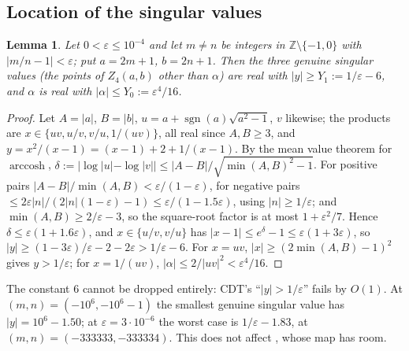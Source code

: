 \documentclass[11pt]{amsart}
\newtheorem{lemma}[proposition]{Lemma}
\theoremstyle{definition}
\theoremstyle{remark}
\numberwithin{equation}{section}
\newcommand{\ZZ}{\mathbb{Z}}
\begin{document}
\subsection{Location of the singular values}

\begin{lemma}\label{lem:S}
Let $0<\varepsilon\le10^{-4}$ and let $m\ne n$ be integers in $\ZZ\setminus\{-1,0\}$ with $|m/n-1|<\varepsilon$; put
$a=2m+1$, $b=2n+1$. Then the three genuine singular values (the points of $Z_4(a,b)$ other than $\alpha$) are real with
$|y|\ge Y_1:=1/\varepsilon-6$, and $\alpha$ is real with $|\alpha|\le Y_0:=\varepsilon^4/16$.
\end{lemma}

\begin{proof}
Let $A=|a|$, $B=|b|$, $u=a+\operatorname{sgn}(a)\sqrt{a^2-1}$, $v$ likewise; the products are $x\in\{uv,u/v,v/u,1/(uv)\}$,
all real since $A,B\ge3$, and $y=x^2/(x-1)=(x-1)+2+1/(x-1)$. By the mean value theorem for $\operatorname{arccosh}$,
$\delta:=|\log|u|-\log|v||\le|A-B|/\sqrt{\min(A,B)^2-1}$. For positive pairs $|A-B|/\min(A,B)<\varepsilon/(1-\varepsilon)$,
for negative pairs $\le2\varepsilon|n|/(2|n|(1-\varepsilon)-1)\le\varepsilon/(1-1.5\varepsilon)$, using $|n|\ge1/\varepsilon$;
and $\min(A,B)\ge2/\varepsilon-3$, so the square-root factor is at most $1+\varepsilon^2/7$. Hence
$\delta\le\varepsilon(1+1.6\varepsilon)$, and $x\in\{u/v,v/u\}$ has $|x-1|\le e^\delta-1\le\varepsilon(1+3\varepsilon)$, so
$|y|\ge(1-3\varepsilon)/\varepsilon-2-2\varepsilon>1/\varepsilon-6$. For $x=uv$, $|x|\ge(2\min(A,B)-1)^2$ gives $y>1/\varepsilon$;
for $x=1/(uv)$, $|\alpha|\le2/|uv|^2<\varepsilon^4/16$.
\end{proof}

The constant $6$ cannot be dropped entirely: CDT's ``$|y|>1/\varepsilon$'' fails by $O(1)$. At
$(m,n)=(-10^6,-10^6-1)$ the smallest genuine singular value has $|y|=10^6-1.50$; at $\varepsilon=3\cdot10^{-6}$ the worst
case is $1/\varepsilon-1.83$, at $(m,n)=(-333333,-333334)$. This does not affect \cite[Thm.~C]{CDT}, whose map has room.
\end{document}
